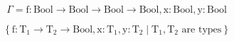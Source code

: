 \documentclass[uplatex,dvipdfmx,ja=standard]{bxjsarticle}
\begin{document}
\[
\Gamma = \mathrm{
	f: Bool \rightarrow Bool \rightarrow Bool \rightarrow Bool,
	x: Bool,
	y: Bool
}
\]

\[
\left\{
	\mathrm{
		f:T_1 \rightarrow T_2 \rightarrow Bool,
		x: T_1,
		y: T_2
	}
	\mid\mathrm{T_1, T_2}\mbox{ are types}
\right\}
\]
\end{document}
